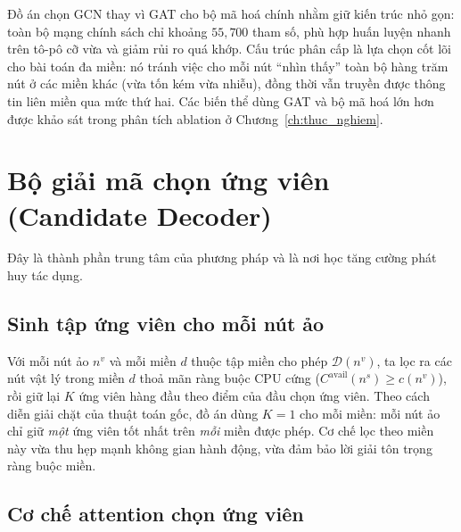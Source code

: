 \documentclass[../DoAn.tex]{subfiles}
\begin{document}
Đồ án chọn GCN thay vì GAT cho bộ mã hoá chính nhằm giữ kiến trúc nhỏ gọn: toàn bộ mạng chính sách chỉ khoảng $55{,}700$ tham số, phù hợp huấn luyện nhanh trên tô-pô cỡ vừa và giảm rủi ro quá khớp. Cấu trúc phân cấp là lựa chọn cốt lõi cho bài toán đa miền: nó tránh việc cho mỗi nút ``nhìn thấy'' toàn bộ hàng trăm nút ở các miền khác (vừa tốn kém vừa nhiễu), đồng thời vẫn truyền được thông tin liên miền qua mức thứ hai. Các biến thể dùng GAT và bộ mã hoá lớn hơn được khảo sát trong phân tích ablation ở Chương~\ref{ch:thuc_nghiem}.

\section{Bộ giải mã chọn ứng viên (Candidate Decoder)} %
\label{sec:decoder}

Đây là thành phần trung tâm của phương pháp và là nơi học tăng cường phát huy tác dụng.

\subsection{Sinh tập ứng viên cho mỗi nút ảo}
\label{subsec:cand-gen}

Với mỗi nút ảo $n^v$ và mỗi miền $d$ thuộc tập miền cho phép $\mathcal{D}(n^v)$, ta lọc ra các nút vật lý trong miền $d$ thoả mãn ràng buộc CPU cứng ($C^{\text{avail}}(n^s) \ge c(n^v)$), rồi giữ lại $K$ ứng viên hàng đầu theo điểm của đầu chọn ứng viên. Theo cách diễn giải chặt của thuật toán gốc, đồ án dùng $K=1$ cho mỗi miền: mỗi nút ảo chỉ giữ \textit{một} ứng viên tốt nhất trên \textit{mỗi} miền được phép. Cơ chế lọc theo miền này vừa thu hẹp mạnh không gian hành động, vừa đảm bảo lời giải tôn trọng ràng buộc miền.

\subsection{Cơ chế attention chọn ứng viên}
\label{subsec:cand-attn}
\end{document}
